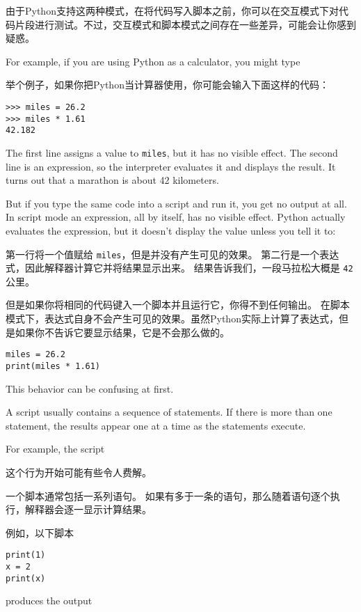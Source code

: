 由于Python支持这两种模式，在将代码写入脚本之前，你可以在交互模式下对代码片段进行测试。不过，交互模式和脚本模式之间存在一些差异，可能会让你感到疑惑。

For example, if you are using Python as a calculator, you might type

举个例子，如果你把Python当计算器使用，你可能会输入下面这样的代码：

\begin{lstlisting}
>>> miles = 26.2
>>> miles * 1.61
42.182
\end{lstlisting}

The first line assigns a value to {\tt miles}, but it has no visible
effect.  The second line is an expression, so the
interpreter evaluates it and displays the result.  It turns out that a
marathon is about 42 kilometers.

But if you type the same code into a script and run it, you get no
output at all.  In script mode an expression, all by itself, has no
visible effect.  Python actually evaluates the expression, but it doesn't
display the value unless you tell it to:

第一行将一个值赋给 \lstinline{miles}，但是并没有产生可见的效果。 第二行是一个表达式，因此解释器计算它并将结果显示出来。 结果告诉我们，一段马拉松大概是 \lstinline{42} 公里。

但是如果你将相同的代码键入一个脚本并且运行它，你得不到任何输出。 在脚本模式下，表达式自身不会产生可见的效果。虽然Python实际上计算了表达式，但是如果你不告诉它要显示结果，它是不会那么做的。

\begin{lstlisting}
miles = 26.2
print(miles * 1.61)
\end{lstlisting}

This behavior can be confusing at first.

A script usually contains a sequence of statements.  If there
is more than one statement, the results appear one at a time
as the statements execute.

For example, the script

这个行为开始可能有些令人费解。

一个脚本通常包括一系列语句。 如果有多于一条的语句，那么随着语句逐个执行，解释器会逐一显示计算结果。

例如，以下脚本

\begin{lstlisting}
print(1)
x = 2
print(x)
\end{lstlisting}
%
produces the output

